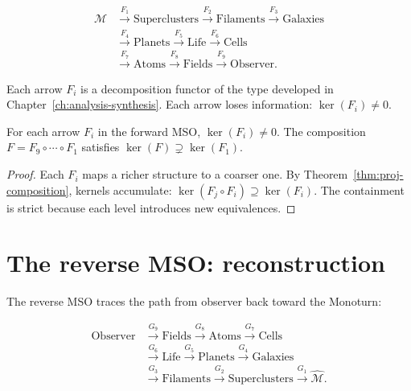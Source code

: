 \begin{equation}
  \begin{aligned}
  \mathcal{M}
  &\xrightarrow{F_1} \text{Superclusters}
   \xrightarrow{F_2} \text{Filaments}
   \xrightarrow{F_3} \text{Galaxies}\\
  &\xrightarrow{F_4} \text{Planets}
   \xrightarrow{F_5} \text{Life}
   \xrightarrow{F_6} \text{Cells}\\
  &\xrightarrow{F_7} \text{Atoms}
   \xrightarrow{F_8} \text{Fields}
   \xrightarrow{F_9} \text{Observer.}
  \end{aligned}
  \label{eq:forward-mso}
\end{equation}

Each arrow $F_i$ is a decomposition functor of the type
developed in Chapter~\ref{ch:analysis-synthesis}.
Each arrow loses information: $\ker(F_i) \neq 0$.

\begin{proposition}
  \label{prop:fmso-loss}
  \statusproven{}
  For each arrow $F_i$ in the forward MSO,
  $\ker(F_i) \neq 0$.
  The composition $F = F_9 \circ \cdots \circ F_1$ satisfies
  $\ker(F) \supsetneq \ker(F_1)$.
\end{proposition}

\begin{proof}
  Each $F_i$ maps a richer structure to a coarser one.
  By Theorem~\ref{thm:proj-composition}, kernels accumulate:
  $\ker(F_j \circ F_i) \supseteq \ker(F_i)$.
  The containment is strict because each level introduces
  new equivalences.
\end{proof}

\section{The reverse MSO: reconstruction}

The reverse MSO traces the path from observer back toward
the Monoturn:

\begin{equation}
  \begin{aligned}
  \text{Observer}
  &\xrightarrow{G_9} \text{Fields}
   \xrightarrow{G_8} \text{Atoms}
   \xrightarrow{G_7} \text{Cells}\\
  &\xrightarrow{G_6} \text{Life}
   \xrightarrow{G_5} \text{Planets}
   \xrightarrow{G_4} \text{Galaxies}\\
  &\xrightarrow{G_3} \text{Filaments}
   \xrightarrow{G_2} \text{Superclusters}
   \xrightarrow{G_1} \widehat{\mathcal{M}}.
  \end{aligned}
  \label{eq:reverse-mso}
\end{equation}

